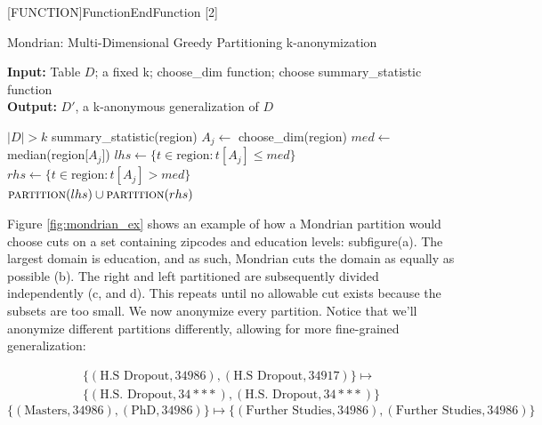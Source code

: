 [FUNCTION]{Function}{EndFunction}%
   [2]{\algorithmicfunction\ }%
   {\algorithmicend\ \algorithmicfunction}%
\begin{algorithm}
\caption{Mondrian: Multi-Dimensional Greedy Partitioning k-anonymization}
\label{mondrian_pseudocode}
\textbf{Input:} Table $D$; a fixed k; choose\_dim function; choose summary\_statistic function \\
\textbf{Output:} $D'$, a k-anonymous generalization of $D$
\begin{algorithmic} %
    \Ensure $|D| > k$
            \Return summary\_statistic(region)
        \Else
            \State $A_j \leftarrow$ choose\_dim(region)
            \State $med \leftarrow$ median(region[$A_j$])
            \State $lhs \leftarrow \{t \in \mbox{region}: t[A_j] \leq med\}$
            \State $rhs \leftarrow \{t \in \mbox{region}: t[A_j] > med\}$
        \EndIf \\
        \Return $\textproc{partition}(lhs) \cup \textproc{partition}(rhs)$
    \EndFunction
\end{algorithmic}
\end{algorithm}

Figure \ref{fig:mondrian_ex} shows an example of how a Mondrian partition would choose cuts on a set containing zipcodes and education levels: subfigure(a). The largest domain is education, and as such, Mondrian cuts the domain as equally as possible (b). The right and left partitioned are subsequently divided independently (c, and d). This repeats until no allowable cut exists because the subsets are too small. We now anonymize every partition. Notice that we'll anonymize different partitions differently, allowing for more fine-grained generalization:

\begin{multline}
    \{(\mbox{H.S Dropout}, 34986), (\mbox{H.S Dropout}, 34917)\}
    \mapsto \\
    \{(\mbox{H.S. Dropout}, 34***),(\mbox{H.S. Dropout},
    34***) \}
    \label{mondrian_gen1}    
\end{multline}
\begin{equation}
     \{(\mbox{Masters}, 34986), (\mbox{PhD}, 34986)\} \mapsto \{(\mbox{Further Studies}, 34986), (\mbox{Further Studies}, 34986)\}
     \label{mondrian_gen2}
\end{equation}

